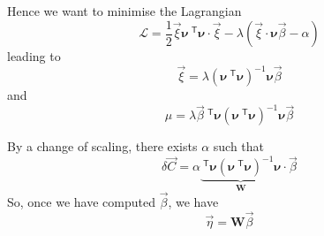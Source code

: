 \documentclass[aps]{revtex4}
\newcommand{\mymat}[1]{\bm{#1}}
\newcommand{\mytrn}[1]{~^{\mathsf{T}}{#1}}
\begin{document}
Hence we want to minimise the Lagrangian
\begin{equation}
	\mathcal{L} = \dfrac{1}{2}\vec{\xi}\mymat{\nu}\mytrn{\mymat{\nu}}\cdot\vec{\xi} 
	- \lambda \left( \vec{\xi} \cdot \mymat{\nu} \vec{\beta} - \alpha\right)
\end{equation}
leading to
\begin{equation}
	\vec{\xi} = \lambda \left(\mymat{\nu}\mytrn{\mymat{\nu}}\right)^{-1} \mymat{\nu} \vec{\beta}
\end{equation}
and
\begin{equation}
	\mu = \lambda \vec{\beta} \mytrn{\mymat{\nu}} \left(\mymat{\nu}\mytrn{\mymat{\nu}}\right)^{-1} \mymat{\nu} \vec{\beta}
\end{equation}

By a change of scaling, there exists $\alpha$ such that
\begin{equation}
	\delta \vec{C} = \alpha \underbrace{\mytrn{\mymat{\nu}} \left(\mymat{\nu}\mytrn{\mymat{\nu}}\right)^{-1} \mymat{\nu}}_{\mymat{W}} \cdot \vec{\beta}
\end{equation}
So, once we have computed $\vec{\beta}$, we have
\begin{equation}
	\vec{\eta} = \mymat{W} \vec{\beta}
\end{equation}
\end{document}
